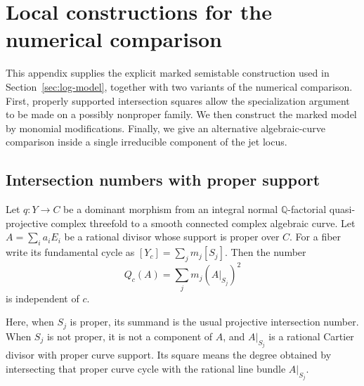 \section{Local constructions for the numerical comparison}
\label{app:local-numerical}

This appendix supplies the explicit marked semistable construction used
in Section~\ref{sec:log-model}, together with two variants of the
numerical comparison.  First, properly supported intersection squares
allow the specialization argument to be made on a possibly nonproper
family.  We then construct the marked model by monomial modifications.
Finally, we give an alternative algebraic-curve comparison inside a
single irreducible component of the jet locus.

\subsection{Intersection numbers with proper support}

\begin{lemma}
\label{lem:supported-square}
Let $q:Y\to C$ be a dominant morphism from an integral normal
$\mathbb Q$-factorial quasi-projective complex threefold to a smooth
connected complex algebraic curve.  Let
$A=\sum_i a_iE_i$ be a rational divisor whose support is proper over
$C$.  For a fiber write its fundamental cycle as
$[Y_c]=\sum_jm_j[S_j]$.  Then the number
\[
 Q_c(A)=\sum_jm_j(A|_{S_j})^2
\]
is independent of $c$.

Here, when $S_j$ is proper, its summand is the usual projective
intersection number.  When $S_j$ is not proper, it is not a component
of $A$, and $A|_{S_j}$ is a rational Cartier divisor with proper curve
support.  Its square means the degree obtained by intersecting that
proper curve cycle with the rational line bundle $A|_{S_j}$.
\end{lemma}

